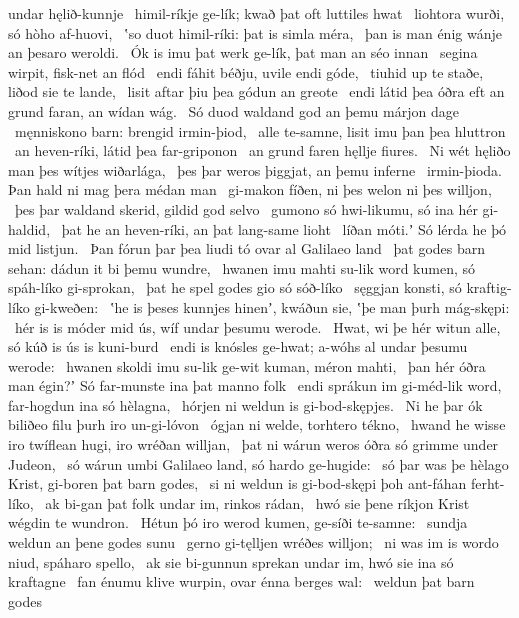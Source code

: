 undar hęlið-kunnje \hld\ himil-ríkje ge-lík;
kwað þat oft luttiles hwat \hld\ liohtora wurði,
só hòho af-huovi, \hld\ ʽso duot himil-ríki:
þat is simla méra, \hld\ þan is man énig
wánje an þesaro weroldi. \hld\ Ók is imu þat werk ge-lík,
þat man an séo innan \hld\ segina wirpit,
fisk-net an flód \hld\ endi fáhit béðju,
uvile endi góde, \hld\ tiuhid up te staðe,
liðod sie te lande, \hld\ lisit aftar þiu
þea gódun an greote \hld\ endi látid þea óðra eft an grund faran,
an wídan wág. \hld\ Só duod waldand god
an þemu márjon dage \hld\ męnniskono barn:
brengid irmin-þiod, \hld\ alle te-samne,
lisit imu þan þea hluttron \hld\ an heven-ríki,
látid þea far-griponon \hld\ an grund faren
hęllje fiures. \hld\ Ni wét hęliðo man
þes wítjes wiðarlága, \hld\ þes þar weros þiggjat,
an þemu inferne \hld\ irmin-þioda.
Þan hald ni mag þera médan man \hld\ gi-makon fíðen,
ni þes welon ni þes willjon, \hld\ þes þar waldand skerid,
gildid god selvo \hld\ gumono só hwi-likumu,
só ina hér gi-haldid, \hld\ þat he an heven-ríki,
an þat lang-same lioht \hld\ líðan móti.ʼ
Só lérda he þó mid listjun. \hld\ Þan fórun þar þea liudi tó
ovar al Galilaeo land \hld\ þat godes barn sehan:
dádun it bi þemu wundre, \hld\ hwanen imu mahti su-lik word kumen,
só spáh-líko gi-sprokan, \hld\ þat he spel godes
gio só sóð-líko \hld\ sęggjan konsti,
só kraftig-líko gi-kweðen: \hld\ ʽhe is þeses kunnjes hinenʼ, kwáðun sie,
ʽþe man þurh mág-skępi: \hld\ hér is is móder mid ús,
wíf undar þesumu werode. \hld\ Hwat, wi þe hér witun alle,
só kúð is ús is kuni-burd \hld\ endi is knósles ge-hwat;
a-wóhs al undar þesumu werode: \hld\ hwanen skoldi imu su-lik ge-wit kuman,
méron mahti, \hld\ þan hér óðra man égin?ʼ
Só far-munste ina þat manno folk \hld\ endi sprákun im gi-méd-lik word,
far-hogdun ina só hèlagna, \hld\ hórjen ni weldun
is gi-bod-skępjes. \hld\ Ni he þar ók biliðeo filu
þurh iro un-gi-lóvon \hld\ ógjan ni welde,
torhtero tékno, \hld\ hwand he wisse iro twíflean hugi,
iro wréðan willjan, \hld\ þat ni wárun weros óðra
só grimme under Judeon, \hld\ só wárun umbi Galilaeo land,
só hardo ge-hugide: \hld\ só þar was þe hèlago Krist,
gi-boren þat barn godes, \hld\ si ni weldun is gi-bod-skępi þoh
ant-fáhan ferht-líko, \hld\ ak bi-gan þat folk undar im,
rinkos rádan, \hld\ hwó sie þene ríkjon Krist
wégdin te wundron. \hld\ Hétun þó iro werod kumen,
ge-síði te-samne: \hld\ sundja weldun
an þene godes sunu \hld\ gerno gi-tęlljen
wréðes willjon; \hld\ ni was im is wordo niud,
spáharo spello, \hld\ ak sie bi-gunnun sprekan undar im,
hwó sie ina só kraftagne \hld\ fan énumu klive wurpin,
ovar énna berges wal: \hld\ weldun þat barn godes
